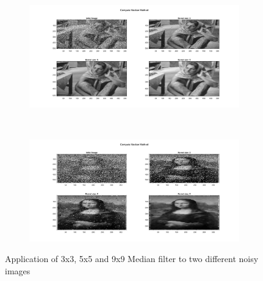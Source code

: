\documentclass{article}
\begin{document}
	\pagebreak
	\begin{figure}[h!]
			\centering
			\begin{subfigure}[t]{0.5\textwidth}
				\centering
				\includegraphics[height=\linewidth, width=\linewidth]{./output_images/img_noisy_1_median.jpg}
			\end{subfigure}%
			~
			\begin{subfigure}[t]{0.5\textwidth}
				\centering
				\includegraphics[height=\linewidth, width=\linewidth]{./output_images/img_noisy_2_median.jpg}
			\end{subfigure}	
			\caption{Application of 3x3, 5x5 and 9x9 Median filter to two different noisy images}
		\end{figure}
\end{document}

